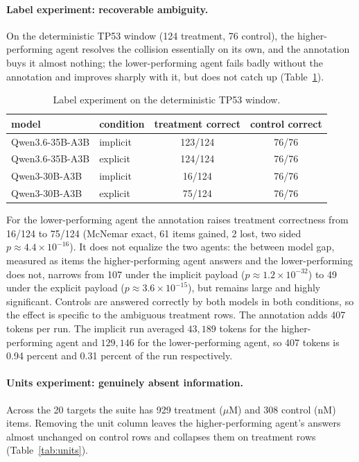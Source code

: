 \documentclass[sigconf]{ceurart}
\begin{document}
\paragraph{Label experiment: recoverable ambiguity.}
On the deterministic TP53 window (124 treatment, 76 control), the higher-performing
agent resolves the collision essentially on its own, and the annotation buys it
almost nothing; the lower-performing agent fails badly without the annotation and
improves sharply with it, but does not catch up (Table~\ref{tab:label}).

\begin{table}[t]
\centering
\caption{Label experiment on the deterministic TP53 window.}
\label{tab:label}
\begin{tabular}{llcc}
\toprule
model & condition & treatment correct & control correct \\
\midrule
Qwen3.6-35B-A3B & implicit & 123/124 & 76/76 \\
Qwen3.6-35B-A3B & explicit & 124/124 & 76/76 \\
Qwen3-30B-A3B   & implicit & 16/124  & 76/76 \\
Qwen3-30B-A3B   & explicit & 75/124  & 76/76 \\
\bottomrule
\end{tabular}
\end{table}

For the lower-performing agent the annotation raises treatment correctness from
16/124 to 75/124 (McNemar exact, 61 items gained, 2 lost, two sided $p \approx
4.4\times10^{-16}$). It does not equalize the two agents: the between model gap,
measured as items the higher-performing agent answers and the lower-performing does
not, narrows from 107 under the implicit payload ($p \approx 1.2\times10^{-32}$) to
49 under the explicit payload ($p \approx 3.6\times10^{-15}$), but remains large and
highly significant. Controls are answered correctly by both models in both
conditions, so the effect is specific to the ambiguous treatment rows. The
annotation adds 407 tokens per run. The implicit run averaged $43{,}189$ tokens for
the higher-performing agent and $129{,}146$ for the lower-performing agent, so 407
tokens is 0.94 percent and 0.31 percent of the run respectively.

\paragraph{Units experiment: genuinely absent information.}
Across the 20 targets the suite has 929 treatment ($\mu$M) and 308 control (nM) items.
Removing the unit column leaves the higher-performing agent's answers almost
unchanged on control rows and collapses them on treatment rows
(Table~\ref{tab:units}).
\end{document}
